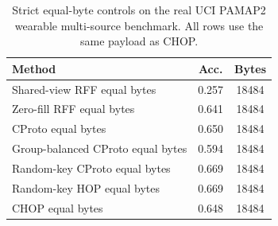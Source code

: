 \begin{table}[t]
\centering
\caption{Strict equal-byte controls on the real UCI PAMAP2 wearable multi-source benchmark. All rows use the same payload as CHOP.}
\label{tab:strict-equal-byte-pamap2}
\begin{tabular}{lcc}
\toprule
Method & Acc. & Bytes \\
\midrule
Shared-view RFF equal bytes & 0.257 & 18484 \\
Zero-fill RFF equal bytes & 0.641 & 18484 \\
CProto equal bytes & 0.650 & 18484 \\
Group-balanced CProto equal bytes & 0.594 & 18484 \\
Random-key CProto equal bytes & 0.669 & 18484 \\
Random-key HOP equal bytes & 0.669 & 18484 \\
CHOP equal bytes & 0.648 & 18484 \\
\bottomrule
\end{tabular}
\end{table}
